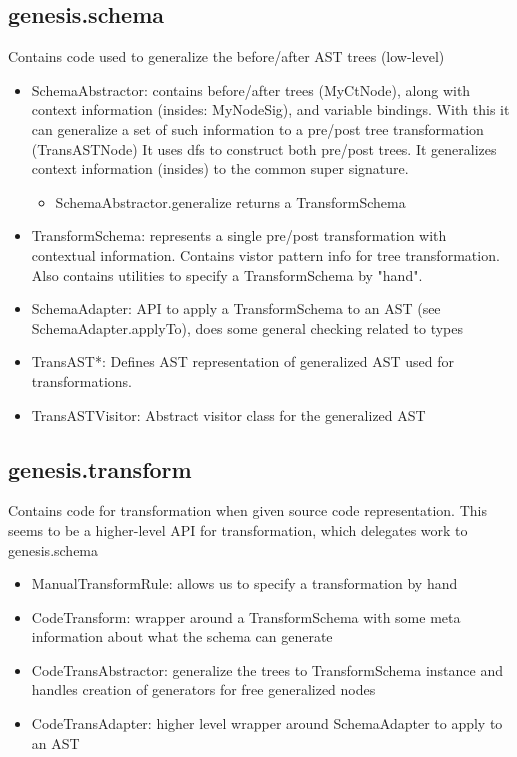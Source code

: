 \documentclass{article}
\begin{document}
\subsection{genesis.schema}
Contains code used to generalize the before/after AST trees (low-level)
\begin{itemize}
	\item SchemaAbstractor: contains before/after trees (MyCtNode), along with context information (insides: MyNodeSig),
    and variable bindings. With this it can generalize a set of such information to a pre/post tree transformation (TransASTNode)
    It uses dfs to construct both pre/post trees. It generalizes context information (insides) to the common super signature.
	\begin{itemize}
		\item SchemaAbstractor.generalize returns a TransformSchema
	\end{itemize}
	
	\item TransformSchema: represents a single pre/post transformation with contextual information. Contains vistor pattern info
  for tree transformation. Also contains utilities to specify a TransformSchema by "hand".

	\item SchemaAdapter: API to apply a TransformSchema to an AST (see SchemaAdapter.applyTo), does some general checking related
  to types

	\item TransAST*: Defines AST representation of generalized AST used for transformations.
	\item TransASTVisitor: Abstract visitor class for the generalized AST
\end{itemize}

\subsection{genesis.transform}
Contains code for transformation when given source code representation. This seems to be a higher-level API for transformation, which delegates work to genesis.schema

\begin{itemize}
	\item ManualTransformRule: allows us to specify a transformation by hand
	\item CodeTransform: wrapper around a TransformSchema with some meta information about what the schema can generate
	\item CodeTransAbstractor: generalize the trees to TransformSchema instance and handles creation of generators for free generalized nodes
	\item CodeTransAdapter: higher level wrapper around SchemaAdapter to apply to an AST
\end{itemize}
\end{document}

